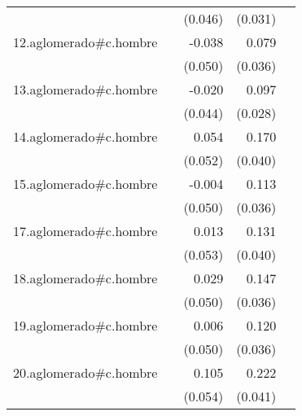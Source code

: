 {\begin{longtable}{l*{4}{D{.}{.}{-1}}}
            &                     &     (0.046)         &     (0.031)         &                     \\
\addlinespace
12.aglomerado#c.hombre&                     &      -0.038         &       0.079\sym{*}  &                     \\
            &                     &     (0.050)         &     (0.036)         &                     \\
\addlinespace
13.aglomerado#c.hombre&                     &      -0.020         &       0.097\sym{***}&                     \\
            &                     &     (0.044)         &     (0.028)         &                     \\
\addlinespace
14.aglomerado#c.hombre&                     &       0.054         &       0.170\sym{***}&                     \\
            &                     &     (0.052)         &     (0.040)         &                     \\
\addlinespace
15.aglomerado#c.hombre&                     &      -0.004         &       0.113\sym{**} &                     \\
            &                     &     (0.050)         &     (0.036)         &                     \\
\addlinespace
17.aglomerado#c.hombre&                     &       0.013         &       0.131\sym{**} &                     \\
            &                     &     (0.053)         &     (0.040)         &                     \\
\addlinespace
18.aglomerado#c.hombre&                     &       0.029         &       0.147\sym{***}&                     \\
            &                     &     (0.050)         &     (0.036)         &                     \\
\addlinespace
19.aglomerado#c.hombre&                     &       0.006         &       0.120\sym{**} &                     \\
            &                     &     (0.050)         &     (0.036)         &                     \\
\addlinespace
20.aglomerado#c.hombre&                     &       0.105         &       0.222\sym{***}&                     \\
            &                     &     (0.054)         &     (0.041)         &                     \\

\end{longtable}}
